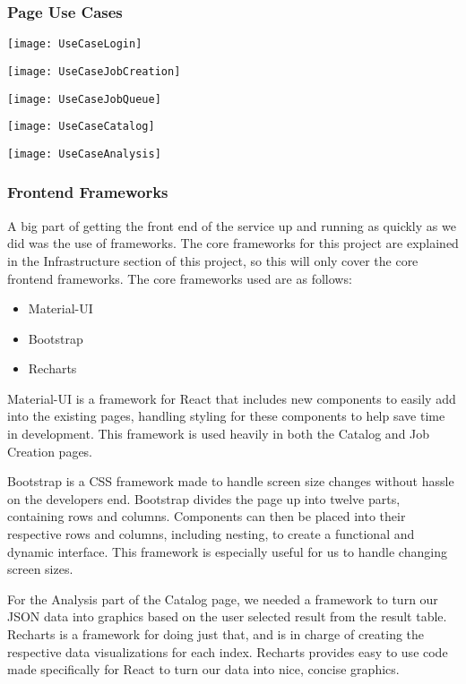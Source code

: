 \subsubsection{Page Use Cases}
\begin{center}
  \texttt{[image: UseCaseLogin]} \\[12pt]
\end{center}
\begin{center}
  \texttt{[image: UseCaseJobCreation]} \\[12pt]
\end{center}
\begin{center}
  \texttt{[image: UseCaseJobQueue]} \\[12pt]
\end{center}
\begin{center}
  \texttt{[image: UseCaseCatalog]} \\[12pt]
\end{center}
\begin{center}
  \texttt{[image: UseCaseAnalysis]} \\[12pt]
\end{center}

\subsubsection{Frontend Frameworks}
A big part of getting the front end of the service up and running as quickly as we did was the use of frameworks. The core frameworks for this project are explained in the Infrastructure section of this project, so this will only cover the core frontend frameworks. The core frameworks used are as follows:
\begin{itemize}
  \item Material-UI
  \item Bootstrap
  \item Recharts
\end{itemize}
Material-UI is a framework for React that includes new components to easily add into the existing pages, handling styling for these components to help save time in development. This framework is used heavily in both the Catalog and Job Creation pages.\par
Bootstrap is a CSS framework made to handle screen size changes without hassle on the developer\textquotesingle s end. Bootstrap divides the page up into twelve parts, containing rows and columns. Components can then be placed into their respective rows and columns, including nesting, to create a functional and dynamic interface. This framework is especially useful for us to handle changing screen sizes.\par
For the Analysis part of the Catalog page, we needed a framework to turn our JSON data into graphics based on the user selected result from the result table. Recharts is a framework for doing just that, and is in charge of creating the respective data visualizations for each index. Recharts provides easy to use code made specifically for React to turn our data into nice, concise graphics.
